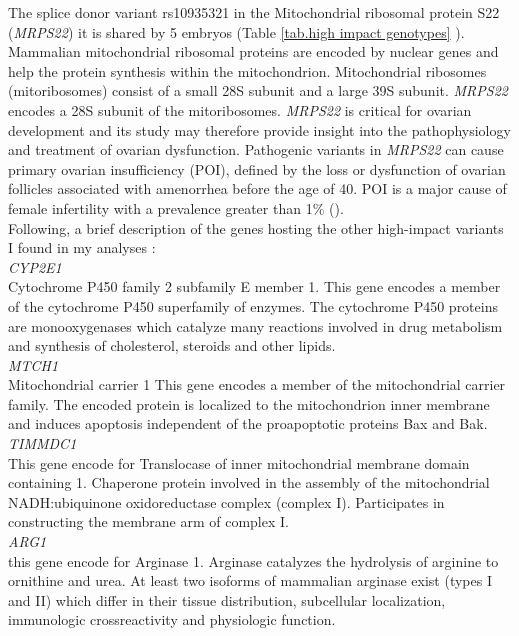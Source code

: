 The splice donor variant rs10935321 in the Mitochondrial ribosomal protein S22 (\textit{MRPS22}) it is shared by 5 embryos (Table \ref{tab.high impact genotypes} ).
Mammalian mitochondrial ribosomal proteins are encoded by nuclear genes and help the protein synthesis within the mitochondrion. Mitochondrial ribosomes (mitoribosomes) consist of a small 28S subunit and a large 39S subunit. \textit{MRPS22} encodes a 28S subunit of the mitoribosomes.
\textit{MRPS22} is critical for ovarian development and its study may therefore provide insight into the pathophysiology and treatment of ovarian dysfunction. Pathogenic variants in \textit{MRPS22} can cause primary ovarian insufficiency (POI), defined by the loss or dysfunction of ovarian follicles associated with amenorrhea before the age of 40. POI is a major cause of female infertility with a prevalence greater than 1\% (\cite{chen2018mutations}).\\ 

Following, a brief description of the genes hosting the other high-impact variants I found in my analyses : \\
\textit{CYP2E1}\\
Cytochrome P450 family 2 subfamily E member 1.
This gene encodes a member of the cytochrome P450 superfamily of enzymes. The cytochrome P450 proteins are monooxygenases which catalyze many reactions involved in drug metabolism and synthesis of cholesterol, steroids and other lipids.\\


\textit{MTCH1}\\
Mitochondrial carrier 1
This gene encodes a member of the mitochondrial carrier family. The encoded protein is localized to the mitochondrion inner membrane and induces apoptosis independent of the proapoptotic proteins Bax and Bak.\\

\textit{TIMMDC1}\\
This gene encode for Translocase of inner mitochondrial membrane domain containing 1.
Chaperone protein involved in the assembly of the mitochondrial NADH:ubiquinone oxidoreductase complex (complex I). Participates in constructing the membrane arm of complex I.\\

\textit{ARG1}\\
this gene encode for Arginase 1.
Arginase catalyzes the hydrolysis of arginine to ornithine and urea. At least two isoforms of mammalian arginase exist (types I and II) which differ in their tissue distribution, subcellular localization, immunologic crossreactivity and physiologic function.\\

